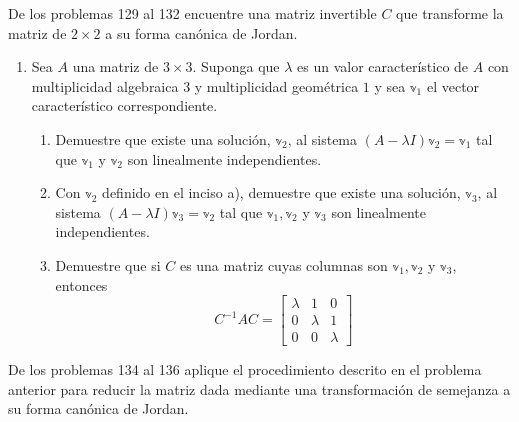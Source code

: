 \newpage\noindent
De los problemas 129 al 132 encuentre una matriz invertible $C$ que transforme la matriz de $2 \times 2$ a su forma canónica de Jordan.
\begin{multienumerate}
    \setcounter{multienumi}{128}
\end{multienumerate}
\begin{enumerate}[start=133]
    \item Sea $A$ una matriz de $3 \times 3$. Suponga que $\lambda$ es un valor característico de $A$ con multiplicidad algebraica $3$ y multiplicidad geométrica $1$ y sea $\mathbb{v}_{1}$ el vector característico correspondiente.
    \begin{enumerate}
        \item Demuestre que existe una solución, $\mathbb{v}_{2}$, al sistema $(A-\lambda I) \mathbb{v}_{2}=\mathbb{v}_{1}$ tal que $\mathbb{v}_{1}$ y $\mathbb{v}_{2}$ son linealmente independientes.
        \item Con $\mathbb{v}_{2}$ definido en el inciso a), demuestre que existe una solución, $\mathbb{v}_{3}$, al sistema $(A-\lambda I) \mathbb{v}_{3}=\mathbb{v}_{2}$ tal que $\mathbb{v}_{1}, \mathbb{v}_{2}$ y $\mathbb{v}_{3}$ son linealmente independientes.
        \item Demuestre que si $C$ es una matriz cuyas columnas son $\mathbb{v}_{1}, \mathbb{v}_{2}$ y $\mathbb{v}_{3}$, entonces
        $$C^{-1} A C=\begin{bmatrix*}
            \lambda & 1 & 0 \\
            0 & \lambda & 1 \\
            0 & 0 & \lambda
        \end{bmatrix*}$$
    \end{enumerate}
\end{enumerate}
De los problemas 134 al 136 aplique el procedimiento descrito en el problema anterior para reducir la matriz dada mediante una transformación de semejanza a su forma canónica de Jordan.
